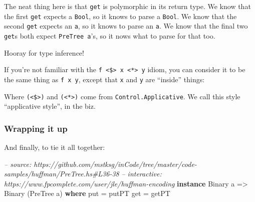 \documentclass[]{article}
\newenvironment{Shaded}{\begin{snugshade}}{\end{snugshade}}
\newcommand{\CommentTok}[1]{\textcolor[rgb]{0.56,0.35,0.01}{\textit{#1}}}
\newcommand{\DataTypeTok}[1]{\textcolor[rgb]{0.13,0.29,0.53}{#1}}
\newcommand{\DecValTok}[1]{\textcolor[rgb]{0.00,0.00,0.81}{#1}}
\newcommand{\FunctionTok}[1]{\textcolor[rgb]{0.00,0.00,0.00}{#1}}
\newcommand{\KeywordTok}[1]{\textcolor[rgb]{0.13,0.29,0.53}{\textbf{#1}}}
\newcommand{\NormalTok}[1]{#1}
\newcommand{\OtherTok}[1]{\textcolor[rgb]{0.56,0.35,0.01}{#1}}
\begin{document}
The neat thing here is that \texttt{get} is polymorphic in its return type. We
know that the first \texttt{get} expects a \texttt{Bool}, so it knows to parse a
\texttt{Bool}. We know that the second \texttt{get} expects an \texttt{a}, so it
knows to parse an \texttt{a}. We know that the final two \texttt{get}s both
expect \texttt{PreTree\ a}'s, so it nows what to parse for that too.

Hooray for type inference!

If you're not familiar with the
\texttt{f\ \textless{}\$\textgreater{}\ x\ \textless{}*\textgreater{}\ y} idiom,
you can consider it to be the same thing as \texttt{f\ x\ y}, except that
\texttt{x} and \texttt{y} are ``inside'' things:

\begin{Shaded}
\end{Shaded}

Where \texttt{(\textless{}\$\textgreater{})} and
\texttt{(\textless{}*\textgreater{})} come from \texttt{Control.Applicative}. We
call this style ``applicative style'', in the biz.

\hypertarget{wrapping-it-up}{%
\subsubsection{Wrapping it up}\label{wrapping-it-up}}

And finally, to tie it all together:

\begin{Shaded}
\begin{Highlighting}[]
\CommentTok{-- source: https://github.com/mstksg/inCode/tree/master/code-samples/huffman/PreTree.hs#L36-38}
\CommentTok{-- interactive: https://www.fpcomplete.com/user/jle/huffman-encoding}
\KeywordTok{instance} \DataTypeTok{Binary}\NormalTok{ a }\OtherTok{=>} \DataTypeTok{Binary}\NormalTok{ (}\DataTypeTok{PreTree}\NormalTok{ a) }\KeywordTok{where}
\NormalTok{    put }\FunctionTok{=}\NormalTok{ putPT}
\NormalTok{    get }\FunctionTok{=}\NormalTok{ getPT}
\end{Highlighting}
\end{Shaded}
\end{document}
